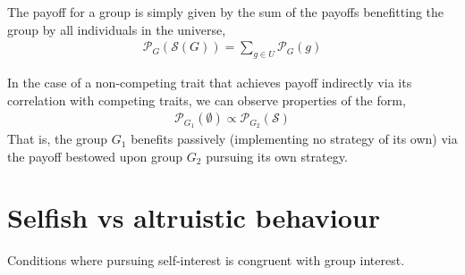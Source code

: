 \documentclass[aps,rmp,twocolumn,amsmath,amssymb,nofootinbib,superscriptaddress]{revtex4}
\begin{document}
The payoff for a group is simply given by the sum of the payoffs benefitting the group by all individuals in the universe,
\begin{align}
	\mathcal{P}_{G}(\mathcal{S}(G)) = \sum_{g\in U} \mathcal{P}_G(g)
\end{align}

In the case of a non-competing trait that achieves payoff indirectly via its correlation with competing traits, we can observe properties of the form,
\begin{align}
	\mathcal{P}_{G_1}(\emptyset) \propto \mathcal{P}_{G_2}(\mathcal{S})
\end{align}
That is, the group $G_1$ benefits passively (implementing no strategy of its own) via the payoff bestowed upon group $G_2$ pursuing its own strategy.

\section{Selfish vs altruistic behaviour}

Conditions where pursuing self-interest is congruent with group interest.
\end{document}
